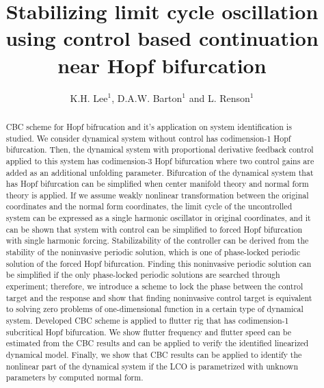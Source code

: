 \documentclass[openacc]{rsproca_new}%
\begin{document}



\title{Stabilizing limit cycle oscillation using control based continuation near Hopf bifurcation}

\author{%
K.H. Lee$^{1}$, D.A.W. Barton$^{1}$ and L. Renson$^{1}$}

\address{$^{1}$Department of Engineering Mathematics, University of Bristol\\}

\subject{mechanical engineering, differential equations}



\begin{abstract}
 CBC scheme for Hopf bifrucation and it's application on system identification is studied. We consider dynamical system without control has codimension-1 Hopf bifurcation. Then, the dynamical system with proportional derivative feedback control applied to this system has codimension-3 Hopf bifurcation where two control gains are added as an additional unfolding parameter. Bifurcation of the dynamical system that has Hopf bifurcation can be simplified when center manifold theory and normal form theory is applied. If we assume weakly nonlinear transformation between the original coordinates and the normal form coordinates, the limit cycle of the uncontrolled system can be expressed as a single harmonic oscillator in original coordinates, and it can be shown that system with control can be simplified to forced Hopf bifurcation with single harmonic forcing. Stabilizability of the controller can be derived from the stability of the noninvasive periodic solution, which is one of phase-locked periodic solution of the forced Hopf bifurcation. Finding this noninvasive periodic solution can be simplified if the only phase-locked periodic solutions are searched through experiment; therefore, we introduce a scheme to lock the phase between the control target and the response and show that finding noninvasive control target is equivalent to solving zero problems of one-dimensional function in a certain type of dynamical system. Developed CBC scheme is applied to flutter rig that has codimension-1 subcritical Hopf bifurcation. We show flutter frequency and flutter speed can be estimated from the CBC results and can be applied to verify the identified linearized dynamical model. Finally, we show that CBC results can be applied to identify the nonlinear part of the dynamical system if the LCO is parametrized with unknown parameters by computed normal form.
\end{abstract}
\end{document}

